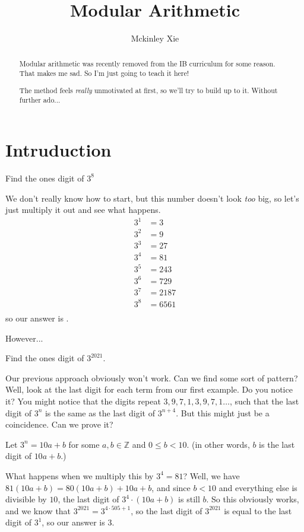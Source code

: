 \documentclass[a4paper]{scrartcl}
\title{Modular Arithmetic}
\author{Mckinley Xie}
\begin{document}
\maketitle
\begin{abstract}
	Modular arithmetic was recently removed from the IB curriculum for some reason. That makes me sad. So I'm just going to teach it here! 

	The method feels \emph{really} unmotivated at first, so we'll try to build up to it. Without further ado...
\end{abstract}

\section{Intruduction}

\begin{example}
	Find the ones digit of $3^8$
\end{example}
We don't really know how to start, but this number doesn't look \emph{too} big, so let's just multiply it out and see what happens.
\begin{align*}
	3^1 &= 3 \\
	3^2 &= 9 \\
	3^3 &= 27 \\
	3^4 &= 81 \\
	3^5 &= 243 \\
	3^6 &= 729 \\
	3^7 &= 2187 \\
	3^8 &= 6561 \\
\end{align*}
so our answer is .

However...
\begin{example}
	Find the ones digit of $3^{2021}$.
\end{example}
Our previous approach obviously won't work. Can we find some sort of pattern? \\
Well, look at the last digit for each term from our first example. Do you notice it? \newpage
You might notice that the digits repeat $3,9,7,1,3,9,7,1\dots$, such that the last digit of $3^n$ is the same as the last digit of $3^{n+4}$. But this might just be a coincidence. Can we prove it?

Let $3^n = 10a + b$ for some $a,b \in \mathbb{Z}$ and $0 \leq b < 10$. (in other words, $b$ is the last digit of $10a + b$.)  

What happens when we multiply this by $3^4 = 81$? Well, we have $81(10a + b) = 80(10a + b) + 10a + b$, and since $b < 10$ and everything else is divisible by $10$, the last digit of $3^4 \cdot \left(10a + b\right)$ is still $b$. So this obviously works, and we know that $3^{2021} = 3^{4 \cdot 505 + 1}$, so the last digit of $3^{2021}$ is equal to the last digit of $3^1$, so our answer is $\boxed{3}$.
\end{document}
